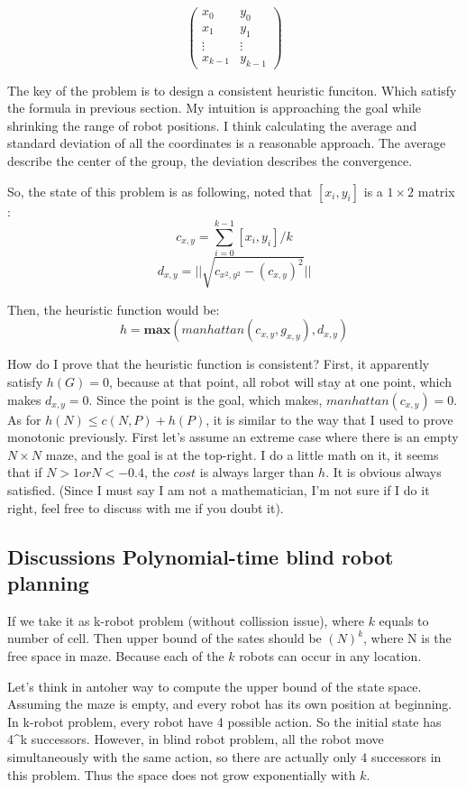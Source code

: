 \documentclass{article}
\begin{document}
$$\begin{pmatrix}
x_0 & y_0 \\
x_1 & y_1 \\
\vdots & \vdots \\	
x_{k-1} & y_{k-1}
\end{pmatrix}$$

The key of the problem is to design a consistent heuristic funciton. Which satisfy the formula in previous section. My intuition is approaching the goal while shrinking the range of robot positions. I think calculating the average and standard deviation of all the coordinates is a reasonable approach. The average describe the center of the group, the deviation describes the convergence. 

So, the state of this problem is as following, noted that $[x_i,y_i]$ is a $1\times 2$ matrix :
$$c_{x,y} = \sum^{k-1}_{i=0}[x_i,y_i]/k$$
$$d_{x,y} = ||\sqrt{ c_{x^2,y^2} - (c_{x,y})^2}||$$

Then, the heuristic function would be:
$$h =\textbf{max}(manhattan(c_{x,y}, g_{x,y}), d_{x,y})$$

How do I prove that the heuristic function is consistent? First, it apparently satisfy $h(G)=0$, because at that point, all robot will stay at one point, which makes $ d_{x,y} = 0$. Since the point is the goal, which makes, $manhattan(c_{x,y})=0$. As for $h(N) \leq c(N,P)+h(P) $, it is similar to the way that I used to prove monotonic previously. First let's assume an extreme case where there is an empty $N \times N$ maze, and the goal is at the top-right. I do a little math on it, it seems that if $N > 1 or N < -0.4$, the $cost$ is always larger than $h$. It is obvious always satisfied. (Since I must say I am not a mathematician, I'm not sure if I do it right, feel free to discuss with me if you doubt it).

\subsection{Discussions Polynomial-time blind robot planning}
If we take it as k-robot problem (without collission issue), where $k$ equals to number of cell. Then upper bound of the sates should be $(N)^k$, where N is the free space in maze. Because each of the $k$ robots can occur in any location.

\if
Let's think in antoher way to compute the upper bound of the state space. Assuming the maze is empty, and every robot has its own position at beginning. In k-robot problem, every robot have 4 possible action. So the initial state has 4^k successors. However, in blind robot problem, all the robot move simultaneously with the same action, so there are actually only 4 successors in this problem. Thus the space does not grow exponentially with $k$.
\fi
\end{document}
